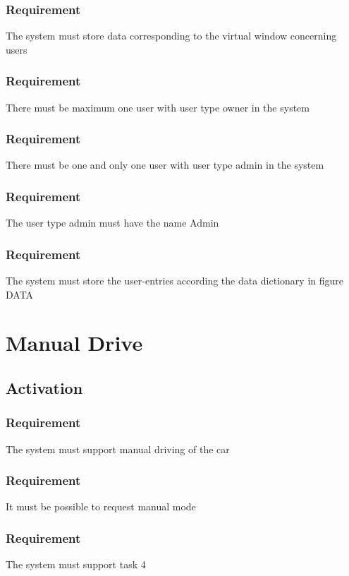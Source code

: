 \documentclass{article}
\begin{document}
{      \subsubsection{Requirement}
\hfill \break 
\- \- \-The system must store data corresponding to the virtual window concerning users
      \subsubsection{Requirement}
\hfill \break 
\- \- \-There must be maximum one user with user type owner in the system
      \subsubsection{Requirement}
\hfill \break 
\- \- \-There must be one and only one user with user type admin in the system
      \subsubsection{Requirement}
\hfill \break 
\- \- \-The user type admin must have the name Admin
      \subsubsection{Requirement}
\hfill \break 
\- \- \-The system must store the user-entries according the data dictionary in figure DATA


\section{Manual Drive}
  \subsection{Activation}
      \subsubsection{Requirement}
\hfill \break 
\- \- \-The system must support manual driving of the car
      \subsubsection{Requirement}
\hfill \break 
\- \- \-It must be possible to request manual mode
      \subsubsection{Requirement}
\hfill \break 
\- \- \-The system must support task 4
}
\end{document}
